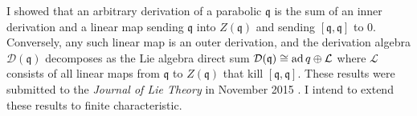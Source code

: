 \documentclass[11pt]{article}
\begin{document}
I showed that an arbitrary derivation of a parabolic $\mathfrak q$ is
the sum of an inner derivation and a linear map sending $\mathfrak q$
into $Z(\mathfrak q)$ and sending $[\mathfrak q, \mathfrak q]$ to $0$.
Conversely, any such linear map is an outer derivation, and the
derivation algebra $\mathcal{D}(\mathfrak{q})$ decomposes as the Lie
algebra direct sum
$\mathcal{D}(\mathfrak{q}) \cong \operatorname{ad} q \oplus \mathcal{L}$
where $\mathcal{L}$ consists of all linear maps from
$\mathfrak{q}$ to $Z(\mathfrak{q})$ that kill
$[\mathfrak{q},\mathfrak{q}]$. These results were submitted to the
\emph{Journal of Lie Theory} in November 2015
\cite{arxiv:brice2015derivations}.
I intend to extend these results to finite characteristic.

\printbibliography[heading=none]

\label{page:last}
\end{document}
